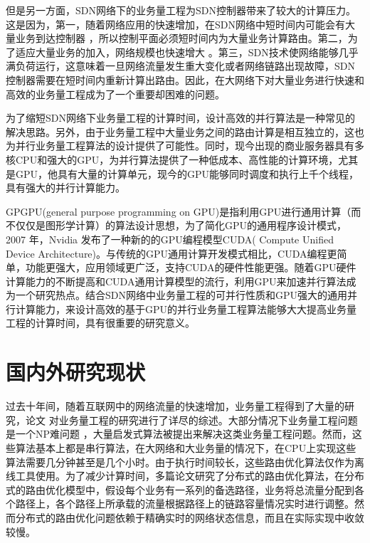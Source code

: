 \documentclass[master]{thesis-uestc}
\begin{document}
但是另一方面，SDN网络下的业务量工程为SDN控制器带来了较大的计算压力。这是因为，第一，随着网络应用的快速增加，在SDN网络中短时间内可能会有大量业务到达控制器 ，所以控制平面必须短时间内为大量业务计算路由。第二，为了适应大量业务的加入，网络规模也快速增大 。第三，SDN技术使网络能够几乎满负荷运行，这意味着一旦网络流量发生重大变化或者网络链路出现故障，SDN控制器需要在短时间内重新计算出路由。因此，在大网络下对大量业务进行快速和高效的业务量工程成为了一个重要却困难的问题。

为了缩短SDN网络下业务量工程的计算时间，设计高效的并行算法是一种常见的解决思路。另外，由于业务量工程中大量业务之间的路由计算是相互独立的，这也为并行业务量工程算法的设计提供了可能性。同时，现今出现的商业服务器具有多核CPU和强大的GPU，为并行算法提供了一种低成本、高性能的计算环境，尤其是GPU，他具有大量的计算单元，现今的GPU能够同时调度和执行上千个线程，具有强大的并行计算能力。

GPGPU(general purpose programming on GPU)是指利用GPU进行通用计算（而不仅仅是图形学计算）的算法设计思想，为了简化GPU的通用程序设计模式，2007 年，Nvidia 发布了一种新的的GPU编程模型CUDA( Compute Unified Device Architecture)。与传统的GPU通用计算开发模式相比，CUDA编程更简单，功能更强大，应用领域更广泛，支持CUDA的硬件性能更强。随着GPU硬件计算能力的不断提高和CUDA通用计算模型的流行，利用GPU来加速并行算法成为一个研究热点。结合SDN网络中业务量工程的可并行性质和GPU强大的通用并行计算能力，来设计高效的基于GPU的并行业务量工程算法能够大大提高业务量工程的计算时间，具有很重要的研究意义。



\section{国内外研究现状}

过去十年间，随着互联网中的网络流量的快速增加，业务量工程得到了大量的研究，论文 对业务量工程的研究进行了详尽的综述。大部分情况下业务量工程问题是一个NP难问题 ，大量启发式算法被提出来解决这类业务量工程问题。然而，这些算法基本上都是串行算法，在大网络和大业务量的情况下，在CPU上实现这些算法需要几分钟甚至是几个小时。由于执行时间较长，这些路由优化算法仅作为离线工具使用。为了减少计算时间，多篇论文研究了分布式的路由优化算法，在分布式的路由优化模型中，假设每个业务有一系列的备选路径，业务将总流量分配到各个路径上，各个路径上所承载的流量根据路径上的链路容量情况实时进行调整。然而分布式的路由优化问题依赖于精确实时的网络状态信息，而且在实际实现中收敛较慢。
\end{document}

